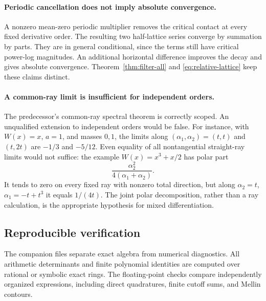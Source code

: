 \paragraph{Periodic cancellation does not imply absolute convergence.}
A nonzero mean-zero periodic multiplier removes the critical
contact at every fixed derivative order. The resulting two
half-lattice series converge by summation by parts. They are in
general conditional, since the terms still have critical
power-log magnitudes. An additional horizontal difference
improves the decay and gives absolute convergence.
Theorem~\ref{thm:filter-all} and
\eqref{eq:relative-lattice} keep these claims distinct.

\paragraph{A common-ray limit is insufficient for independent orders.}
The predecessor's common-ray spectral theorem is correctly
scoped. An unqualified extension to independent orders would
be false. For instance, with \(W(x)=x\), \(a=1\), and masses
\(0,1\), the limits along \((\alpha_1,\alpha_2)=(t,t)\) and
\((t,2t)\) are \(-1/3\) and \(-5/12\).
Even equality of all nontangential straight-ray limits would
not suffice: the example \(W(x)=x^3+x/2\) has polar part
\[
 \frac{\alpha_2^2}{4(\alpha_1+\alpha_2)}.
\]
It tends to zero on every fixed ray with nonzero total direction,
but along \(\alpha_2=t\),
\(\alpha_1=-t+t^3\) it equals \(1/(4t)\).
The joint polar decomposition, rather than a ray calculation,
is the appropriate hypothesis for mixed differentiation.

\subsection{Reproducible verification}

The companion files separate exact algebra from numerical
diagnostics. All arithmetic determinants and finite polynomial
identities are computed over rational or symbolic exact rings.
The floating-point checks compare independently organized
expressions, including direct quadratures, finite cutoff sums,
and Mellin contours.

